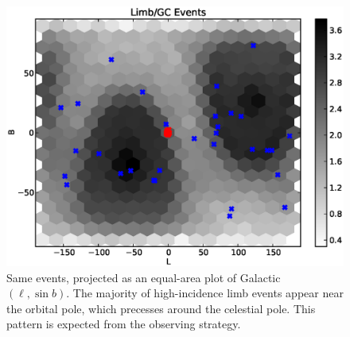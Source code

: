 \documentclass[aps,twocolumn,prd,superscriptaddress,showpacs,nofootinbib,fixfloat]{revtex4}
\begin{document}
% 
\begin{figure}
  \centering
  \includegraphics[width=1.0\linewidth]{plots/limb_l_b.eps}
  \caption{Same events, projected as an equal-area plot of
  Galactic $(\ell, \sin b)$.  The majority of high-incidence
  limb events appear near the orbital pole, which precesses
  around the celestial pole.  This pattern is expected from
  the observing strategy.}
  \label{fig:l-b}
\end{figure}

\end{document}
